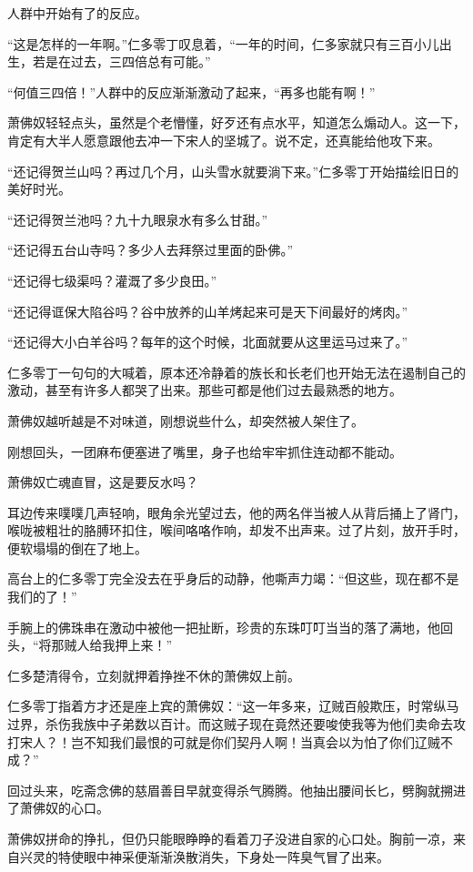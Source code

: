人群中开始有了的反应。

“这是怎样的一年啊。”仁多零丁叹息着，“一年的时间，仁多家就只有三百小儿出生，若是在过去，三四倍总有可能。”

“何值三四倍！”人群中的反应渐渐激动了起来，“再多也能有啊！”

萧佛奴轻轻点头，虽然是个老懵懂，好歹还有点水平，知道怎么煽动人。这一下，肯定有大半人愿意跟他去冲一下宋人的坚城了。说不定，还真能给他攻下来。

“还记得贺兰山吗？再过几个月，山头雪水就要淌下来。”仁多零丁开始描绘旧日的美好时光。

“还记得贺兰池吗？九十九眼泉水有多么甘甜。”

“还记得五台山寺吗？多少人去拜祭过里面的卧佛。”

“还记得七级渠吗？灌溉了多少良田。”

“还记得诓保大陷谷吗？谷中放养的山羊烤起来可是天下间最好的烤肉。”

“还记得大小白羊谷吗？每年的这个时候，北面就要从这里运马过来了。”

仁多零丁一句句的大喊着，原本还冷静着的族长和长老们也开始无法在遏制自己的激动，甚至有许多人都哭了出来。那些可都是他们过去最熟悉的地方。

萧佛奴越听越是不对味道，刚想说些什么，却突然被人架住了。

刚想回头，一团麻布便塞进了嘴里，身子也给牢牢抓住连动都不能动。

萧佛奴亡魂直冒，这是要反水吗？

耳边传来噗噗几声轻响，眼角余光望过去，他的两名伴当被人从背后捅上了肾门，喉咙被粗壮的胳膊环扣住，喉间咯咯作响，却发不出声来。过了片刻，放开手时，便软塌塌的倒在了地上。

高台上的仁多零丁完全没去在乎身后的动静，他嘶声力竭：“但这些，现在都不是我们的了！”

手腕上的佛珠串在激动中被他一把扯断，珍贵的东珠叮叮当当的落了满地，他回头，“将那贼人给我押上来！”

仁多楚清得令，立刻就押着挣挫不休的萧佛奴上前。

仁多零丁指着方才还是座上宾的萧佛奴：“这一年多来，辽贼百般欺压，时常纵马过界，杀伤我族中子弟数以百计。而这贼子现在竟然还要唆使我等为他们卖命去攻打宋人？！岂不知我们最恨的可就是你们契丹人啊！当真会以为怕了你们辽贼不成？”

回过头来，吃斋念佛的慈眉善目早就变得杀气腾腾。他抽出腰间长匕，劈胸就搠进了萧佛奴的心口。

萧佛奴拼命的挣扎，但仍只能眼睁睁的看着刀子没进自家的心口处。胸前一凉，来自兴灵的特使眼中神采便渐渐涣散消失，下身处一阵臭气冒了出来。

